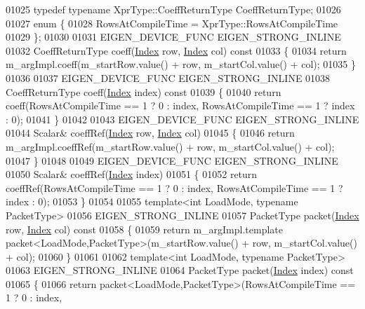 \begin{DoxyCode}
01025   \textcolor{keyword}{typedef} \textcolor{keyword}{typename} XprType::CoeffReturnType CoeffReturnType;
01026 
01027   \textcolor{keyword}{enum} \{
01028     RowsAtCompileTime = XprType::RowsAtCompileTime
01029   \};
01030  
01031   EIGEN\_DEVICE\_FUNC EIGEN\_STRONG\_INLINE
01032   CoeffReturnType coeff(\hyperlink{namespace_eigen_a62e77e0933482dafde8fe197d9a2cfde}{Index} row, \hyperlink{namespace_eigen_a62e77e0933482dafde8fe197d9a2cfde}{Index} col)\textcolor{keyword}{ const}
01033 \textcolor{keyword}{  }\{ 
01034     \textcolor{keywordflow}{return} m\_argImpl.coeff(m\_startRow.value() + row, m\_startCol.value() + col); 
01035   \}
01036   
01037   EIGEN\_DEVICE\_FUNC EIGEN\_STRONG\_INLINE
01038   CoeffReturnType coeff(\hyperlink{namespace_eigen_a62e77e0933482dafde8fe197d9a2cfde}{Index} index)\textcolor{keyword}{ const}
01039 \textcolor{keyword}{  }\{ 
01040     \textcolor{keywordflow}{return} coeff(RowsAtCompileTime == 1 ? 0 : index, RowsAtCompileTime == 1 ? index : 0);
01041   \}
01042 
01043   EIGEN\_DEVICE\_FUNC EIGEN\_STRONG\_INLINE
01044   Scalar& coeffRef(\hyperlink{namespace_eigen_a62e77e0933482dafde8fe197d9a2cfde}{Index} row, \hyperlink{namespace_eigen_a62e77e0933482dafde8fe197d9a2cfde}{Index} col)
01045   \{ 
01046     \textcolor{keywordflow}{return} m\_argImpl.coeffRef(m\_startRow.value() + row, m\_startCol.value() + col); 
01047   \}
01048   
01049   EIGEN\_DEVICE\_FUNC EIGEN\_STRONG\_INLINE
01050   Scalar& coeffRef(\hyperlink{namespace_eigen_a62e77e0933482dafde8fe197d9a2cfde}{Index} index)
01051   \{ 
01052     \textcolor{keywordflow}{return} coeffRef(RowsAtCompileTime == 1 ? 0 : index, RowsAtCompileTime == 1 ? index : 0);
01053   \}
01054  
01055   \textcolor{keyword}{template}<\textcolor{keywordtype}{int} LoadMode, \textcolor{keyword}{typename} PacketType>
01056   EIGEN\_STRONG\_INLINE
01057   PacketType packet(\hyperlink{namespace_eigen_a62e77e0933482dafde8fe197d9a2cfde}{Index} row, \hyperlink{namespace_eigen_a62e77e0933482dafde8fe197d9a2cfde}{Index} col)\textcolor{keyword}{ const }
01058 \textcolor{keyword}{  }\{ 
01059     \textcolor{keywordflow}{return} m\_argImpl.template packet<LoadMode,PacketType>(m\_startRow.value() + row, m\_startCol.value() + 
      col); 
01060   \}
01061 
01062   \textcolor{keyword}{template}<\textcolor{keywordtype}{int} LoadMode, \textcolor{keyword}{typename} PacketType>
01063   EIGEN\_STRONG\_INLINE
01064   PacketType packet(\hyperlink{namespace_eigen_a62e77e0933482dafde8fe197d9a2cfde}{Index} index)\textcolor{keyword}{ const }
01065 \textcolor{keyword}{  }\{ 
01066     \textcolor{keywordflow}{return} packet<LoadMode,PacketType>(RowsAtCompileTime == 1 ? 0 : index,

\end{DoxyCode}
